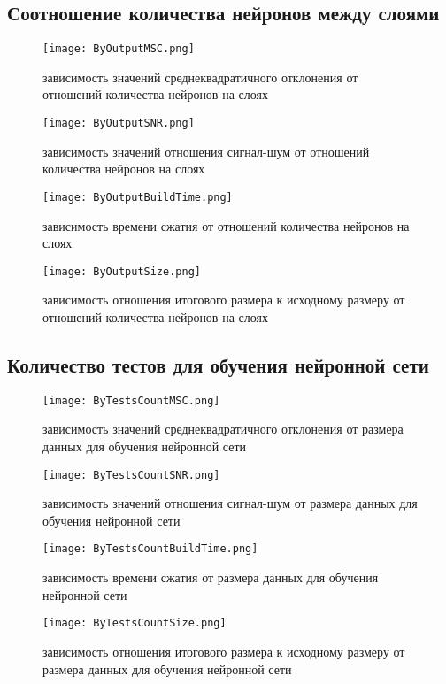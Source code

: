 \subsection{Соотношение количества нейронов между слоями}
\label{sub:analysis:output}

\begin{figure}[ht]
\centering
  \texttt{[image: ByOutputMSC.png]}
  \caption{ зависимость значений среднеквадратичного отклонения от отношений количества нейронов на слоях }
  \label{fig:by_output_msc}
\end{figure}

\begin{figure}[ht]
\centering
  \texttt{[image: ByOutputSNR.png]}
  \caption{ зависимость значений отношения сигнал-шум от отношений количества нейронов на слоях }
  \label{fig:by_output_snr}
\end{figure}

\begin{figure}[ht]
\centering
  \texttt{[image: ByOutputBuildTime.png]}
  \caption{ зависимость времени сжатия от отношений количества нейронов на слоях }
  \label{fig:by_output_build_time}
\end{figure}

\begin{figure}[ht]
\centering
  \texttt{[image: ByOutputSize.png]}
  \caption{ зависимость отношения итогового размера к исходному размеру от отношений количества нейронов на слоях }
  \label{fig:by_output_build_time}
\end{figure}

\subsection{Количество тестов для обучения нейронной сети}
\label{sub:analysis:tests}

\begin{figure}[ht]
\centering
  \texttt{[image: ByTestsCountMSC.png]}
  \caption{ зависимость значений среднеквадратичного отклонения от размера данных для обучения нейронной сети }
  \label{fig:by_tests_count_msc}
\end{figure}

\begin{figure}[ht]
\centering
  \texttt{[image: ByTestsCountSNR.png]}
  \caption{ зависимость значений отношения сигнал-шум от размера данных для обучения нейронной сети }
  \label{fig:by_tests_count_snr}
\end{figure}

\begin{figure}[ht]
\centering
  \texttt{[image: ByTestsCountBuildTime.png]}
  \caption{ зависимость времени сжатия от размера данных для обучения нейронной сети }
  \label{fig:by_tests_count_build_time}
\end{figure}

\begin{figure}[ht]
\centering
  \texttt{[image: ByTestsCountSize.png]}
  \caption{ зависимость отношения итогового размера к исходному размеру от размера данных для обучения нейронной сети }
  \label{fig:by_tests_count_build_time}
\end{figure}
